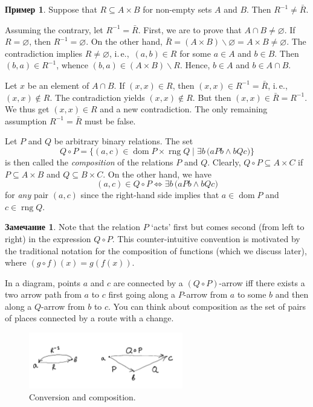 \documentclass[12pt,notitlepage]{article}
\theoremstyle{plain}
\theoremstyle{definition}
\newtheorem{exm}[thm]{Пример}
\newtheorem{rem}[thm]{Замечание}
\theoremstyle{plain}
\newcommand{\sbs}{\subseteq}
\renewcommand{\setminus}{\smallsetminus}
\newcommand{\void}{\varnothing}
\newcommand{\dom}{\mathop{\mathrm{dom}}}
\newcommand{\rng}{\mathop{\mathrm{rng}}}
\newcommand{\1}{\mathbf{1}}
\newcommand{\0}{\mathbf{0}}
\begin{document}
\begin{exm}
	Suppose that $R \sbs A \times B$ for non-empty sets $A$ and $B$. Then $R^{-1} \neq \bar R$.
	
	Assuming the contrary, let $R^{-1} = \bar R$. First, we are to prove that $A \cap B \neq \void$.  If $R = \void$, then $R^{-1} = \void$. On the other hand, $\bar R = (A \times B) \setminus \void = A \times B \neq \void$. The contradiction implies $R \neq \void$, i.\,e.,\ $(a,b) \in R$ for some $a \in A$ and $b \in B$. Then $(b,a) \in R^{-1}$, whence $(b,a) \in (A \times B) \setminus R$. Hence, $b \in A$ and $b \in A \cap B$. 
	
	Let $x$ be an element of $A \cap B$. If $(x,x) \in R$, then $(x,x) \in R^{-1} = \bar R$, i.\,e.,\ $(x,x) \notin R$. The contradiction yields $(x,x) \notin R$. But then $(x,x) \in \bar R = R^{-1}$. We thus get $(x,x) \in R$ and a new contradiction. The only remaining assumption $R^{-1} = \bar R$ must be false.
\end{exm}

Let $P$ and $Q$ be arbitrary binary relations. The set 
$$Q \circ P = \{(a, c) \in \dom P \times \rng Q \mid \exists b\, \bigl( a P b \wedge b Q c \bigr)\}$$
is then called the \emph{composition} of the relations $P$ and $Q$. Clearly, $Q \circ P \sbs A \times C$ if $P \sbs A \times B$ and $Q \sbs B \times C$. On the other hand, we have
$$(a,c) \in Q \circ P \iff \exists b\, \bigl( a P b \wedge b Q c \bigr)$$
for \emph{any} pair $(a, c)$ since the right-hand side implies that $a \in \dom P$ and $c \in \rng Q$.

\begin{rem}
	Note that the relation $P$ `acts' first but comes second (from left to right) in the expression $Q \circ P$. This counter-intuitive convention is motivated by the traditional notation for the composition of functions (which we discuss later), where $(g \circ f)(x) = g(f(x))$.
\end{rem}

In a diagram, points $a$ and $c$ are connected by a $(Q \circ P)$-arrow iff there exists a two arrow path from $a$ to $c$ first going along a $P$-arrow from $a$ to some $b$ and then along a $Q$-arrow from $b$ to $c$. You can think about composition as the set of pairs of places connected by a route with a change.


\begin{figure}[h]
	\centering
	\includegraphics*[width=0.6\textwidth]{conv_comp.pdf}
	\caption{Conversion and composition.}
\end{figure}
\end{document}
